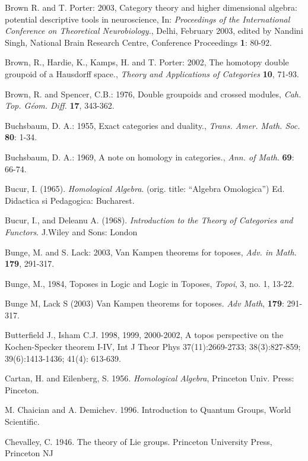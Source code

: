 \documentclass[12pt]{article}
\theoremstyle{plain}
\theoremstyle{definition}
\numberwithin{equation}{section}
\begin{document}
\begin{thebibliography}{9}
Brown R. and T. Porter: 2003, Category theory and higher dimensional algebra: potential descriptive tools in neuroscience, In: {\em Proceedings of the International Conference on Theoretical
Neurobiology.}, Delhi, February 2003, edited by Nandini Singh, National Brain Research Centre, Conference Proceedings \textbf{1}: 80-92.

Brown, R., Hardie, K., Kamps, H. and T. Porter: 2002, The homotopy double groupoid of a Hausdorff space., \emph{Theory and Applications of Categories} \textbf{10}, 71-93.

Brown, R. and Spencer, C.B.: 1976, Double groupoids and crossed modules, \emph{Cah.  Top. G\'{e}om. Diff.} \textbf{17}, 343-362.

Buchsbaum, D. A.: 1955, Exact categories and duality., {\em Trans. Amer. Math. Soc.} \textbf{80}: 1-34.

Buchsbaum, D. A.: 1969, A note on homology in categories., {\em Ann. of Math}. \textbf{69}: 66-74.

Bucur, I. (1965). {\em Homological Algebra}. (orig. title: ``Algebra Omologica'')
Ed. Didactica si Pedagogica: Bucharest.

Bucur, I., and Deleanu A. (1968). {\em  Introduction to the Theory of Categories and Functors}. J.Wiley and Sons: London

Bunge, M. and S. Lack: 2003, Van Kampen theorems for toposes, \emph{Adv. in Math.} \textbf{179}, 291-317.

Bunge, M., 1984, Toposes in Logic and Logic in Toposes, {\em Topoi}, 3, no. 1, 13-22. 

Bunge M, Lack S (2003) Van Kampen theorems for toposes. {\em Adv Math}, \textbf {179}: 291-317.

Butterfield J., Isham C.J. 1998, 1999, 2000-2002, A topos perspective on the Kochen-Specker theorem
I-IV, Int J Theor Phys 37(11):2669-2733; 38(3):827-859; 39(6):1413-1436; 41(4): 613-639.

Cartan, H. and Eilenberg, S. 1956. {\em Homological Algebra}, Princeton Univ. Press: Pinceton. 

M. Chaician and A. Demichev. 1996. Introduction to Quantum Groups, World Scientific.

Chevalley, C. 1946. The theory of Lie groups. Princeton University Press, Princeton NJ


\end{thebibliography}
\end{document}
